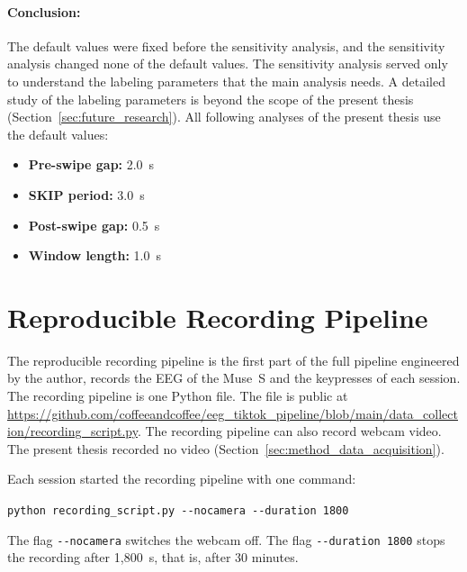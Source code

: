 \documentclass[12pt,a4paper]{report}
\begin{document}
\paragraph{Conclusion:} The default values were fixed before the sensitivity analysis, and the sensitivity analysis changed none of the default values. The sensitivity analysis served only to understand the labeling parameters that the main analysis needs. A detailed study of the labeling parameters is beyond the scope of the present thesis (Section~\ref{sec:future_research}). All following analyses of the present thesis use the default values:
\begin{itemize}
    \item \textbf{Pre-swipe gap:} 2.0~s
    \item \textbf{SKIP period:} 3.0~s
    \item \textbf{Post-swipe gap:} 0.5~s
    \item \textbf{Window length:} 1.0~s
\end{itemize}


\section{Reproducible Recording Pipeline}
\label{sec:method_universal_recording_pipeline}
The reproducible recording pipeline is the first part of the full pipeline engineered by the author, records the EEG of the Muse~S and the keypresses of each session. The recording pipeline is one Python file. The file is public at \url{https://github.com/coffeeandcoffee/eeg_tiktok_pipeline/blob/main/data_collection/recording_script.py}. The recording pipeline can also record webcam video. The present thesis recorded no video (Section~\ref{sec:method_data_acquisition}).

Each session started the recording pipeline with one command:
\begin{center}
\verb|python recording_script.py --nocamera --duration 1800|
\end{center}
The flag \verb|--nocamera| switches the webcam off. The flag \verb|--duration 1800| stops the recording after 1,800~s, that is, after 30 minutes.
\end{document}
